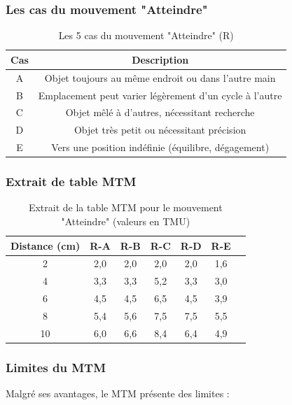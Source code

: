 \documentclass[a4paper,12pt]{article}
\begin{document}
\subsubsection{Les cas du mouvement "Atteindre"}

\begin{table}[ht]
\centering
\begin{tabular}{|c|c|}
\hline
\textbf{Cas} & \textbf{Description} \\
\hline
A & Objet toujours au même endroit ou dans l'autre main \\
B & Emplacement peut varier légèrement d'un cycle à l'autre \\
C & Objet mêlé à d'autres, nécessitant recherche \\
D & Objet très petit ou nécessitant précision \\
E & Vers une position indéfinie (équilibre, dégagement) \\
\hline
\end{tabular}
\caption{Les 5 cas du mouvement "Atteindre" (R)}
\end{table}

\subsubsection{Extrait de table MTM}

\begin{table}[ht]
\centering
\begin{tabular}{|c|c|c|c|c|c|c|}
\hline
\textbf{Distance (cm)} & \textbf{R-A} & \textbf{R-B} & \textbf{R-C} & \textbf{R-D} & \textbf{R-E} \\
\hline
2 & 2,0 & 2,0 & 2,0 & 2,0 & 1,6 \\
4 & 3,3 & 3,3 & 5,2 & 3,3 & 3,0 \\
6 & 4,5 & 4,5 & 6,5 & 4,5 & 3,9 \\
8 & 5,4 & 5,6 & 7,5 & 7,5 & 5,5 \\
10 & 6,0 & 6,6 & 8,4 & 6,4 & 4,9 \\
\hline
\end{tabular}
\caption{Extrait de la table MTM pour le mouvement "Atteindre" (valeurs en TMU)}
\end{table}

\subsubsection{Limites du MTM}

Malgré ses avantages, le MTM présente des limites :
\end{document}
